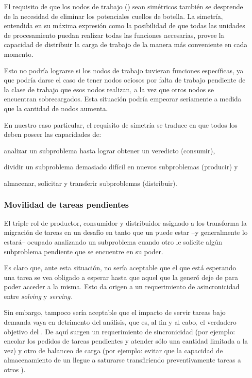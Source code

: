 El requisito de que los nodos de trabajo (\ws) sean simétricos también se desprende
de la necesidad de eliminar los potenciales cuellos de botella. La simetría, entendida en su
máxima expresión como la posibilidad de que todas las unidades de
procesamiento puedan realizar todas las funciones necesarias, provee la
capacidad de distribuir la carga de trabajo de la manera más conveniente en
cada momento.

Esto no podría lograrse si los nodos de trabajo tuvieran
funciones específicas, ya que podría darse el caso de tener nodos ociosos
por falta de trabajo pendiente de la clase de trabajo que esos nodos realizan, 
a la vez que otros nodos se encuentran sobrecargados. Esta situación podría empeorar
seriamente a medida que la cantidad de nodos aumenta.

En nuestro caso particular, el requisito de simetría se traduce en que
todos los \ws deben poseer las capacidades de: \begin{inparaenum}[a)] \item analizar un
subproblema hasta lograr obtener un veredicto (consumir), \item
dividir un subproblema demasiado difícil en nuevos subproblemas (producir) y \item almacenar,
solicitar y transferir subproblemas (distribuir). \end{inparaenum}


\subsubsection{Movilidad de tareas pendientes}

El triple rol de productor, consumidor y distribuidor asignado a los \ws
transforma la migración de tareas en un desafío en tanto que un \w puede
estar --y generalmente lo estará-- ocupado analizando un
subproblema cuando otro \w le solicite algún subproblema
pendiente que se encuentre en su poder.

Es claro que, ante esta situación, no sería aceptable que el \w que está
esperando una tarea se vea obligado a esperar hasta que aquel que la generó
deje de \solvear para poder acceder a la misma. Esto da origen a un requerimiento
de asincronicidad entre \emph{solving} y \emph{serving}.

Sin embargo, tampoco sería aceptable que el impacto de servir tareas bajo demanda vaya en
detrimento del análisis, que es, al fin y al cabo, el verdadero objetivo del \w.
De aquí surgen un requerimiento de sincronicidad (por ejemplo: encolar los pedidos de
tareas pendientes y atender sólo una cantidad limitada a la vez) y otro de balanceo
de carga (por ejemplo: evitar que la capacidad de almacenamiento de un \w llegue a
saturarse transfiriendo preventivamente tareas a otros \ws).

